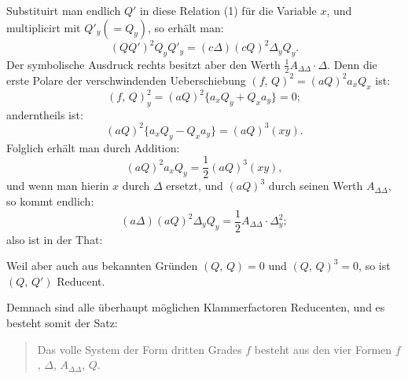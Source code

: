 Substituirt man endlich $Q'$ in diese Relation (1) für die Variable $x$, und multiplicirt mit $Q'_y (= Q_y)$, so erhält man:
\[
(QQ')^2 Q_y Q'_y = (c\Delta)(cQ)^2 \Delta_y Q_y.
\]
Der symbolische Ausdruck rechts besitzt aber den Werth $\frac{1}{2}A_{\Delta\Delta}\cdot\Delta$. Denn die erste Polare der verschwindenden Ueberschiebung $(f,\,Q)^2 = (aQ)^2 a_x Q_x$ ist:
\[
(f,\,Q)_y^2 = (aQ)^2\{a_x Q_y + Q_x a_y\} = 0;
\]
anderntheils ist:
\[
(aQ)^2\{a_x Q_y - Q_x a_y\} = (aQ)^3(xy).
\]
Folglich erhält man durch Addition:
\[
(aQ)^2 a_x Q_y = \frac{1}{2}(aQ)^3(xy),
\]
und wenn man hierin $x$ durch $\Delta$ ersetzt, und $(aQ)^3$ durch seinen Werth $A_{\Delta\Delta}$, so kommt endlich:
\[
(a\Delta)(aQ)^2 \Delta_y Q_y = \frac{1}{2}A_{\Delta\Delta}\cdot \Delta_y^2;
\]
also ist in der That:


Weil aber auch aus bekannten Gründen $(Q,\,Q) = 0$ und $(Q,\,Q)^3 = 0$, so ist $(Q,\,Q')$ Reducent.

Demnach sind alle überhaupt möglichen Klammerfactoren Reducenten, und es besteht somit der Satz:

\begin{quote}
\glqq Das volle System der Form dritten Grades $f$ besteht aus den vier Formen $f$, $\Delta$, $A_{\Delta\Delta}$, $Q$.\grqq{}
\end{quote}


